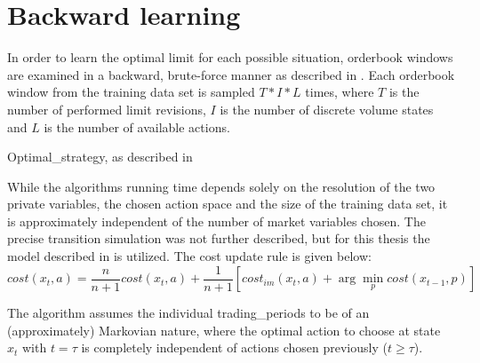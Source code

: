 \section{Backward learning}
\label{chap:backwardlearning}
In order to learn the optimal limit for each possible situation, orderbook windows are examined in a backward, brute-force manner as described in . Each orderbook window from the training data set is sampled $T*I*L$ times, where $T$ is the number of performed limit revisions, $I$ is the number of discrete volume states and $L$ is the number of available actions.\\

\begin{algorithm}[H] 
 \caption{Optimal\_strategy, as described in \Cite{Nevmyvaka:2006}}
     \SetAlgoLined
     \footnotesize
     

\label{alg:bruteforce:pseudocode}
\end{algorithm}\bigskip

While the algorithms running time depends solely on the resolution of the two private variables, the chosen action space and the size of the training data set, it is approximately independent of the number of market variables chosen. The precise transition simulation was not further described, but for this thesis the model described in  is utilized. The cost update rule is given below: 
\begin{equation}\label{eq:costfunction}
   cost(x_t, a) = \dfrac{n}{n+1} cost(x_t, a) + \dfrac{1}{n+1} [cost_{im}(x_t,a) + \arg\min_{p}cost(x_{t-1}, p)]
\end{equation}

The algorithm assumes the individual trading\_periods to be of an (approximately) Markovian nature, where the optimal action to choose at state $x_t$ with $t = \tau$ is completely independent of actions chosen previously ($t \geq \tau$).\\

